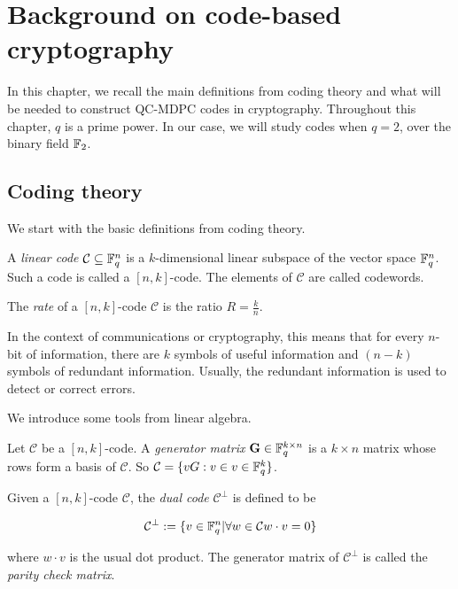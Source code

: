 \section{Background on code-based cryptography}

In this chapter, we recall the main definitions from coding theory and what will be needed to construct QC-MDPC codes in cryptography. Throughout this chapter, $q$ is a prime power. In our case, we will study codes when $q=2$, over the binary field $\mathbb{F}_2$.

\subsection{Coding theory}
We start with the basic definitions from coding theory.

\begin{defn}
A \textit{linear code} $\mathcal{C} \subseteq \mathbb{F}_q^n$ is a $k$-dimensional linear subspace of the vector space $\mathbb{F}_q^n$. Such a code is called a $[n,k]$-code. The elements of $\mathcal{C}$ are called codewords.
\end{defn}

\begin{defn}
The \textit{rate} of a $[n,k]$-code $\mathcal{C}$ is the ratio $ R = \frac{k}{n}$.

In the context of communications or cryptography, this means that for every $n$-bit of information, there are $k$ symbols of useful information and $(n-k)$ symbols of redundant information. Usually, the redundant information is used to detect or correct errors.
\end{defn}

We introduce some tools from linear algebra.

\begin{defn}
Let $\mathcal{C}$ be a $[n,k]$-code. A \textit{generator matrix} $\mathbf{G} \in \mathbb{F}_q^{k \times n}$ is a $k \times n$ matrix whose rows form a basis of $\mathcal{C}$. So $\mathcal{C} = \{ vG: v \in v \in \mathbb{F}_q^k\}$.
\end{defn}

\begin{defn}
Given a $[n,k]$-code $\mathcal{C}$, the \textit{dual code} $\mathcal{C}^\perp$ is defined to be

\[
\mathcal{C}^\perp := \{ v \in \mathbb{F}_q^n | \forall w \in \mathcal{C} w \cdot v = 0 \}   
\]

where $ w \cdot v $ is the usual dot product. The generator matrix of $\mathcal{C}^\perp$ is called the \textit{parity check matrix}.
\end{defn}

